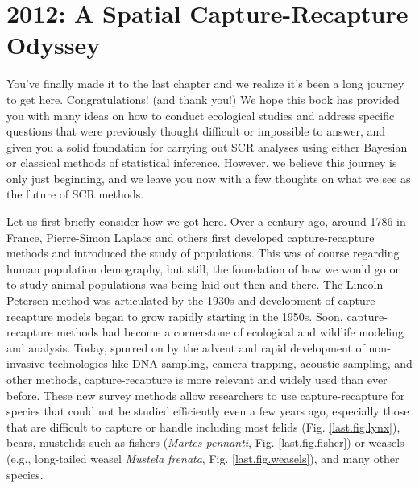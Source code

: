 \chapter{
2012: A Spatial Capture-Recapture Odyssey
}

\label{chapt.final}

\vspace{0.3cm}


You've finally made it to the last chapter and we realize it's been a
long journey to get here. Congratulations! (and thank you!) 
We hope this book has
provided you with many ideas on how to conduct ecological studies and
address specific questions that were previously thought difficult or
impossible to answer, and given you a solid foundation for carrying
out SCR analyses using either Bayesian or classical methods of
statistical inference.  However, we believe this journey is only just
beginning, and we leave you now with a few thoughts on what we see as
the future of SCR methods.

Let us first briefly consider how we got here. Over a century ago,
around 1786 in France, Pierre-Simon Laplace and others first developed
capture-recapture methods and introduced the study of populations.
This was of course regarding
human population demography, but still, the foundation of how we would
go on to study animal populations was being laid out then and there.
The Lincoln-Petersen method was articulated by the 1930s and
development of capture-recapture models began to grow rapidly starting
in the 1950s.  Soon, capture-recapture methods had become a
cornerstone of ecological and wildlife modeling and analysis. Today,
spurred on by the advent and rapid development of non-invasive
technologies like DNA sampling, camera trapping, acoustic sampling,
and other methods, capture-recapture is more relevant and widely used
than ever before. These new survey methods allow researchers to use
capture-recapture for species that could not be studied efficiently
even a few years ago, especially those that are difficult to capture
or handle including most felids (Fig. \ref{last.fig.lynx}), bears,
mustelids such as fishers ({\it Martes pennanti},
Fig. \ref{last.fig.fisher}) or weasels (e.g., long-tailed weasel {\it
  Mustela frenata}, Fig. \ref{last.fig.weasels}), and many other
species.


